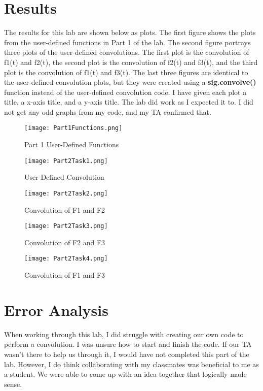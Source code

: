 \documentclass[12pt]{report}
\begin{document}
\section{Results}

The results for this lab are shown below as plots. The first figure shows the plots from the user-defined functions in Part 1 of the lab. The second figure portrays three plots of the user-defined convolutions. The first plot is the convolution of f1(t) and f2(t), the second plot is the convolution of f2(t) and f3(t), and the third plot is the convolution of f1(t) and f3(t). The last three figures are identical to the user-defined convolution plots, but they were created using a \textbf{sig.convolve()} function instead of the user-defined convolution code. I have given each plot a title, a x-axis title, and a y-axis title. The lab did work as I expected it to. I did not get any odd graphs from my code, and my TA confirmed that. 



\begin{figure}
\texttt{[image: Part1Functions.png]}
\caption{Part 1 User-Defined Functions}
\end{figure}

\begin{figure}
\texttt{[image: Part2Task1.png]}
\caption{User-Defined Convolution}
\end{figure}

\begin{figure}
\texttt{[image: Part2Task2.png]}
\caption{Convolution of F1 and F2}
\end{figure}

\begin{figure}
\texttt{[image: Part2Task3.png]}
\caption{Convolution of F2 and F3}
\end{figure}

\begin{figure}
\texttt{[image: Part2Task4.png]}
\caption{Convolution of F1 and F3}
\end{figure}


\newpage

\section{Error Analysis}

When working through this lab, I did struggle with creating our own code to perform a convolution. I was unsure how to start and finish the code. If our TA wasn't there to help us through it, I would have not completed this part of the lab. However, I do think collaborating with my classmates was beneficial to me as a student. We were able to come up with an idea together that logically made sense. 
\end{document}
